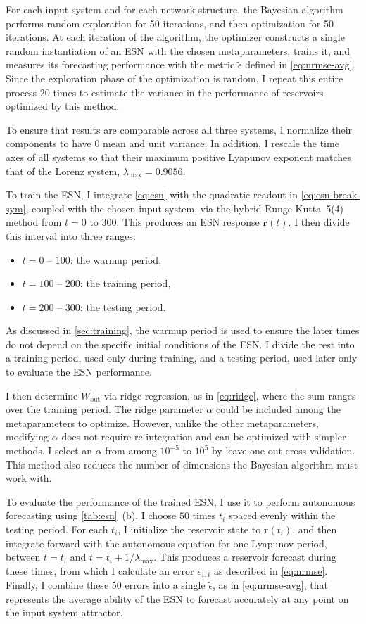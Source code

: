 For each input system and for each network structure, the Bayesian
algorithm performs random exploration for 50 iterations, and then
optimization for 50 iterations. At each iteration of the algorithm,
the optimizer constructs a single random instantiation of an ESN with
the chosen metaparameters, trains it, and measures its forecasting
performance with the metric $\tilde{\epsilon}$ defined in
\cref{eq:nrmse-avg}. Since the exploration phase of the optimization
is random, I repeat this entire process 20 times to estimate the
variance in the performance of reservoirs optimized by this method.

To ensure that results are comparable across all three systems, I
normalize their components to have $0$ mean and unit variance. In
addition, I rescale the time axes of all systems so that their maximum
positive Lyapunov exponent matches that of the Lorenz system,
$\lambda_\text{max} = 0.9056$.

To train the ESN, I integrate \cref{eq:esn} with the quadratic readout
in \cref{eq:esn-break-sym}, coupled with the chosen input system, via
the hybrid Runge-Kutta~5(4)\cite{dormand1980} method from $t = 0$ to
$300$. This produces an ESN response $\bm{r}(t)$. I then divide this interval into three ranges:
\begin{itemize}
\item $t = 0$ -- $100$: the warmup period,
\item $t = 100$ -- $200$: the training period,
\item $t = 200$ -- $300$: the testing period.
\end{itemize}
As discussed in \cref{sec:training}, the warmup period is used to
ensure the later times do not depend on the specific initial
conditions of the ESN. I divide the rest into a training period, used
only during training, and a testing period, used later only to
evaluate the ESN performance.

I then determine $W_\text{out}$ via ridge regression, as in
\cref{eq:ridge}, where the sum ranges over the training period. The
ridge parameter $\alpha$ could be included among the metaparameters to
optimize. However, unlike the other metaparameters, modifying $\alpha$
does not require re-integration and can be optimized with simpler
methods. I select an $\alpha$ from among $10^{-5}$ to $10^5$ by
leave-one-out cross-validation. This method also reduces the number of
dimensions the Bayesian algorithm must work with.

To evaluate the performance of the trained ESN, I use it to perform
autonomous forecasting using \cref{tab:esn}~(b). I choose $50$ times
$t_i$ spaced evenly within the testing period. For each $t_i$, I
initialize the reservoir state to $\mathbf{r}(t_i)$, and then
integrate forward with the autonomous equation for one Lyapunov
period, between $t = t_i$ and $t = t_i + 1 / \lambda_\text{max}$. This
produces a reservoir forecast during these times, from which I
calculate an error $\epsilon_{1,i}$ as described in
\cref{eq:nrmse}. Finally, I combine these $50$ errors into a single
$\tilde{\epsilon}$, as in \cref{eq:nrmse-avg}, that represents the
average ability of the ESN to forecast accurately at any point on the
input system attractor.

